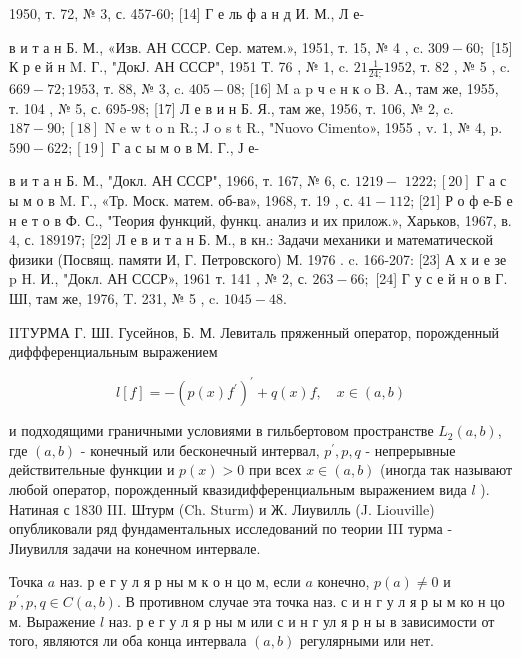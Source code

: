 \documentclass[10pt]{article}
\begin{document}
1950, т. 72, № 3, с. 457-60; [14] Г е ль ф а н д И. М., Л е-

в и т а н Б. М., «Изв. АН СССР. Сер. матем.», 1951, т. 15, № 4 , c. $309-60 ;$ [15] К р е й н M. Г., "ДокЈ. АН СССР", 1951 Т. 76 , № 1, c. $21 \frac{1}{24 ;} 1952$, т. 82 , № 5 , c. $669-72 ; 1953$, т. 88, № 3, c. $405-08$; [16] M a p ч e н к o B. А., там же, 1955, т. 104 , № 5, с. 695-98; [17] Л е в и н Б. Я., там же, 1956, т. 106, № 2, c. $187-90 ;[18]$ N e w t o n R.; J o s t R., "Nuovo Cimento», 1955 , v. 1, № 4, p. $590-622 ;[19]$ Г а с ы м о в М. Г., Ј е-

в и т а н Б. М., "Докл. АН СССР", 1966, т. 167, № 6, с. $1219-$ $1222 ;[20]$ Г а с ы м о в M. Г., «Тр. Моск. матем. об-ва», 1968, т. 19 , с. $41-112$; [21] Р о ф е-Б е н е т о в Ф. С., "Теория функций, функц. анализ и их прилож.», Харьков, 1967, в. 4, с. 189197; [22] Л е в и т а н Б. М., в кн.: Задачи механики и математической физики (Посвящ. памяти И, Г. Петровского) М. 1976 . c. 166-207: [23] А х и е зе p H. И., "Докл. АН СССР», 1961 т. 141 , № 2, с. $263-66 ;$ [24] Г у с е й н о в Г. ШІ, там же, 1976, T. 231, № 5 , c. $1045-48$.



IITУРМА Г. ШІ. Гусейнов, Б. М. Левиталь пряженный оператор, порожденный диффференциальным выражением



\[

l[f]=-\left(p(x) f^{\prime}\right)^{\prime}+q(x) f, \quad x \in(a, b)

\]



и подходящими граничными условиями в гильбертовом пространстве $L_{2}(a, b)$, где $(a, b)$ - конечный или бесконечный интервал, $p^{\prime}, p, q$ - непрерывные действительные функции и $p(x)>0$ при всех $x \in(a, b)$ (иногда так называют любой оператор, порожденный квазидифференциальным выражением вида $l$ ). Натиная с 1830 III. Штурм (Ch. Sturm) и Ж. Лиувилль (J. Liouville) опубликовали ряд фундаментальных исследований по теории III турма - ЈІиувилля задачи на конечном интервале.



Точка $a$ наз. р е г у л я р ны м к о н цо м, если $a$ конечно, $p(a) \neq 0$ и $p^{\prime}, p, q \in C(a, b)$. В противном случае эта точка наз. с и н г у л я р ы м ко н цо м. Выражение $l$ наз. р е г у л я р ны м или с и н г ул я р н ы в зависимости от того, являются ли оба конца интервала $(a, b)$ регулярными или нет.
\end{document}
